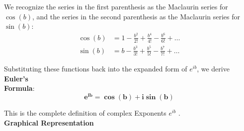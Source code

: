 \documentclass[10pt,twoside]{report}
\begin{document}
We recognize the series in the first parenthesis as the Maclaurin series for $\cos(b)$, and the series in the second parenthesis as the Maclaurin series for $\sin(b)$:
\begin{align*}
    \cos(b) &= 1 - \frac{b^2}{2!} + \frac{b^4}{4!} - \frac{b^6}{6!} + \ldots \\
    \sin(b) &= b - \frac{b^3}{3!} + \frac{b^5}{5!} - \frac{b^7}{7!} + \ldots
\end{align*}

Substituting these functions back into the expanded form of $e^{ib}$, we derive \textbf{Euler's\\ Formula}:
\begin{equation} \label{eq:euler}
    \mathbf{e^{ib} = \cos(b) + i\sin(b)}
\end{equation}

This is the complete definition of complex Exponents $e^{ib}$ .\\
\textbf{Graphical Representation}
\end{document}

